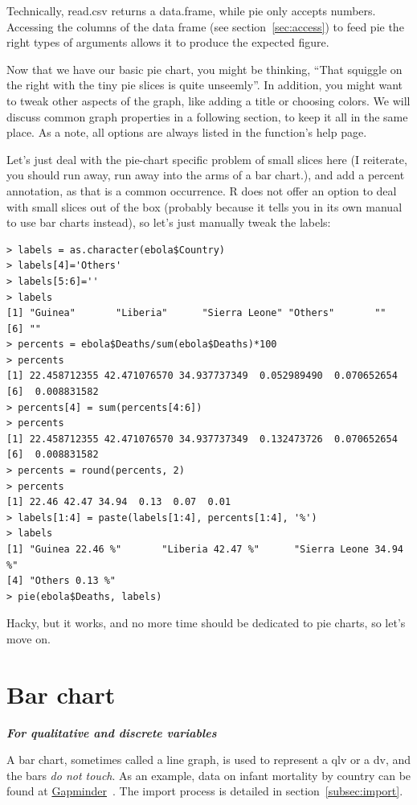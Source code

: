 \documentclass{report}
\newcommand{\code}[1]{\textsf{\ttfamily #1}}
\newcommand{\notefor}[1]{\hfill\textbf{\textit{#1}}}
\begin{document}
	Technically, \code{read.csv} returns a \code{data.frame}, while \code{pie} only accepts numbers. Accessing the columns of the data frame (see section~\ref{sec:access}) to feed \code{pie} the right types of arguments allows it to produce the expected figure.

	Now that we have our basic pie chart, you might be thinking, ``That squiggle on the right with the tiny pie slices is quite unseemly''. In addition, you might want to tweak other aspects of the graph, like adding a title or choosing colors. We will discuss common graph properties in a following section, to keep it all in the same place. As a note, all options are always listed in the function's help page.
		
	Let's just deal with the pie-chart specific problem of small slices here (I reiterate, you should run away, run away into the arms of a bar chart.), and add a percent annotation, as that is a common occurrence. R does not offer an option to deal with small slices out of the box (probably because it tells you in its own manual to use bar charts instead), so let's just manually tweak the labels:
	\begin{verbatim}
> labels = as.character(ebola$Country)
> labels[4]='Others'
> labels[5:6]=''
> labels
[1] "Guinea"       "Liberia"      "Sierra Leone" "Others"       ""            
[6] ""
> percents = ebola$Deaths/sum(ebola$Deaths)*100
> percents
[1] 22.458712355 42.471076570 34.937737349  0.052989490  0.070652654
[6]  0.008831582
> percents[4] = sum(percents[4:6])
> percents
[1] 22.458712355 42.471076570 34.937737349  0.132473726  0.070652654
[6]  0.008831582
> percents = round(percents, 2)
> percents
[1] 22.46 42.47 34.94  0.13  0.07  0.01
> labels[1:4] = paste(labels[1:4], percents[1:4], '%')
> labels
[1] "Guinea 22.46 %"       "Liberia 42.47 %"      "Sierra Leone 34.94 %"
[4] "Others 0.13 %"
> pie(ebola$Deaths, labels)
	\end{verbatim}
	Hacky, but it works, and no more time should be dedicated to pie charts, so let's move on.

	\section{Bar chart}
	\notefor{For qualitative and discrete variables}
		
	A bar chart, sometimes called a line graph, is used to represent a \gls{qlv} or a \gls{dv}, and the bars \emph{do not touch}. As an example, data on infant mortality by country can be found at \href{https://docs.google.com/spreadsheets/d/1OHMMuHbSFKDolNHXsmgHYlkjSKfAZyyY1P-ddMu_Fz0/pub}{Gapminder}~\cite{gapminder}. The import process is detailed in section~\ref{subsec:import}.
\end{document}
